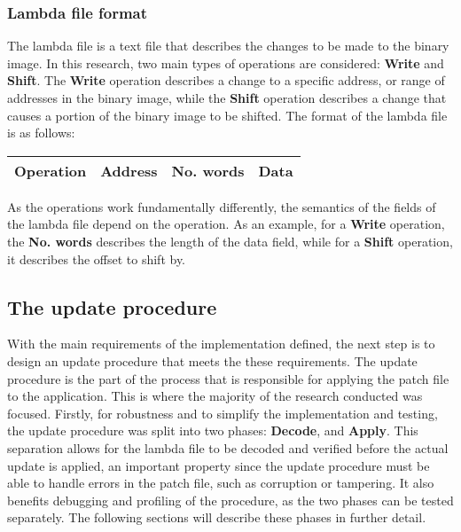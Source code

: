 \subsubsection*{Lambda file format}
The lambda file is a text file that describes the changes to be made to the binary image. In this research, two main types of operations are considered: \textbf{Write} and \textbf{Shift}. The \textbf{Write} operation describes a change to a specific address, or range of addresses in the binary image, while the \textbf{Shift} operation describes a change that causes a portion of the binary image to be shifted. The format of the lambda file is as follows:

\begin{center}
\begin{tabular}{|c|c|c|c|}
\hline
\textbf{Operation} & \textbf{Address} & \textbf{No. words}  & \textbf{Data} \\
\hline
\end{tabular}
\end{center}
As the operations work fundamentally differently, the semantics of the fields of the lambda file depend on the operation. As an example, for a \textbf{Write} operation, the \textbf{No. words} describes the length of the data field, while for a \textbf{Shift} operation, it describes the offset to shift by.
\subsection{The update procedure}\label{sec:updateprocedure}
With the main requirements of the implementation defined, the next step is to design an update procedure that meets the these requirements. The update procedure is the part of the process that is responsible for applying the patch file to the application. This is where the majority of the research conducted was focused. Firstly, for robustness and to simplify the implementation and testing, the update procedure was split into two phases: \textbf{Decode}, and \textbf{Apply}. This separation allows for the lambda file to be decoded and verified before the actual update is applied, an important property since the update procedure must be able to handle errors in the patch file, such as corruption or tampering. It also benefits debugging and profiling of the procedure, as the two phases can be tested separately. The following sections will describe these phases in further detail. 

